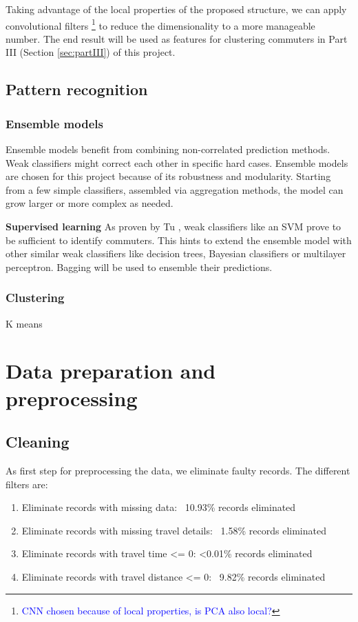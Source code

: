 \documentclass{article}
\newcommand{\technicalDoubt}[1]{\footnote{\textcolor{blue}{#1}}}
\begin{document}
Taking advantage of the local properties of the proposed structure, we can apply convolutional filters \technicalDoubt{CNN chosen because of local properties, is PCA also local?} to reduce the dimensionality to a more manageable number. The end result will be used as features for clustering commuters in Part III (Section \ref{sec:partIII}) of this project. 

\subsection{Pattern recognition}

\subsubsection{Ensemble models}
Ensemble models benefit from combining non-correlated prediction methods. Weak classifiers might correct each other in specific hard cases. Ensemble models are chosen for this project because of its robustness and modularity. Starting from a few simple classifiers, assembled via aggregation methods, the model can grow larger or more complex as needed.

\textbf{Supervised learning}
As proven by Tu \cite{tu2016impact}, weak classifiers like an SVM prove to be sufficient to identify commuters. This hints to extend the ensemble model with other similar weak classifiers like decision trees, Bayesian classifiers or multilayer perceptron. Bagging will be used to ensemble their predictions.

\subsubsection{Clustering}
K means 


\newpage
\section{Data preparation and preprocessing}
\label{sec:partI}

\subsection{Cleaning}
As first step for preprocessing the data, we eliminate faulty records. The different filters are:

\begin{enumerate}
\item Eliminate records with missing data: ~10.93\% records eliminated
\item Eliminate records with missing travel details: ~1.58\% records eliminated
\item Eliminate records with travel time <= 0: <0.01\% records eliminated
\item Eliminate records with travel distance <= 0: ~9.82\% records eliminated
\end{enumerate}
\end{document}
